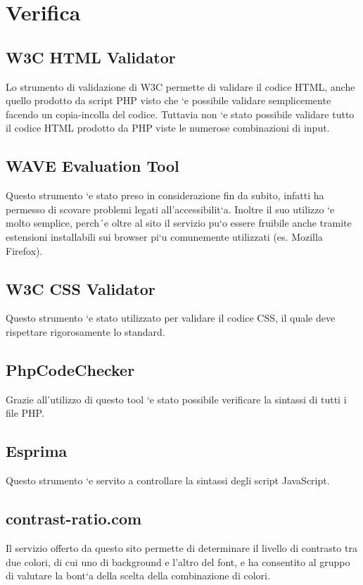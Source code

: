 \section{Verifica}

\subsection{W3C HTML Validator}
Lo strumento di validazione di W3C permette di validare il codice HTML, anche quello prodotto da
script PHP visto che `e possibile validare semplicemente facendo un copia-incolla del codice. Tuttavia
non `e stato possibile validare tutto il codice HTML prodotto da PHP viste le numerose combinazioni
di input.

\subsection{WAVE Evaluation Tool}
Questo strumento `e stato preso in considerazione fin da subito, infatti ha permesso di scovare problemi
legati all’accessibilit`a. Inoltre il suo utilizzo `e molto semplice, perch´e oltre al sito il servizio pu`o
essere fruibile anche tramite estensioni installabili sui browser pi`u comunemente utilizzati (es. Mozilla
Firefox).

\subsection{W3C CSS Validator}
Questo strumento `e stato utilizzato per validare il codice CSS, il quale deve rispettare rigorosamente
lo standard.

\subsection{PhpCodeChecker}
Grazie all’utilizzo di questo tool `e stato possibile verificare la sintassi di tutti i file PHP.

\subsection{Esprima}
Questo strumento `e servito a controllare la sintassi degli script JavaScript.

\subsection{contrast-ratio.com}
Il servizio offerto da questo sito permette di determinare il livello di contrasto tra due colori, di cui
uno di background e l’altro del font, e ha consentito al gruppo di valutare la bont`a della scelta della
combinazione di colori.
